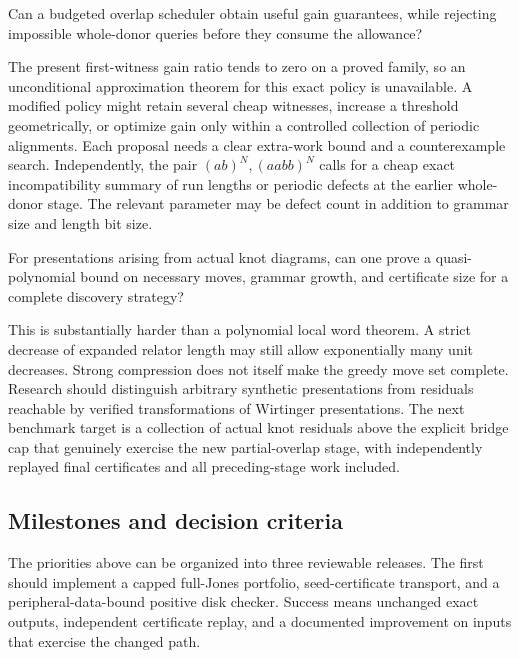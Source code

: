 \begin{question}
Can a budgeted overlap scheduler obtain useful gain guarantees, while
rejecting impossible whole-donor queries before they consume the allowance?
\end{question}

The present first-witness gain ratio tends to zero on a proved family, so
an unconditional approximation theorem for this exact policy is unavailable.
A modified policy might retain several cheap witnesses, increase a threshold
geometrically, or optimize gain only within a controlled collection of
periodic alignments. Each proposal needs a clear extra-work bound and a
counterexample search. Independently, the pair $(ab)^N,(aabb)^N$ calls for
a cheap exact incompatibility summary of run lengths or periodic defects
at the earlier whole-donor stage. The relevant parameter may be defect count
in addition to grammar size and length bit size.

\begin{question}
For presentations arising from actual knot diagrams, can one prove a
quasi-polynomial bound on necessary moves, grammar growth, and certificate
size for a complete discovery strategy?
\end{question}

This is substantially harder than a polynomial local word theorem. A strict
decrease of expanded relator length may still allow exponentially many
unit decreases. Strong compression does not itself make the greedy move
set complete. Research should distinguish arbitrary synthetic presentations
from residuals reachable by verified transformations of Wirtinger
presentations. The next benchmark target is a collection of actual knot
residuals above the explicit bridge cap that genuinely exercise the new
partial-overlap stage, with independently replayed final certificates and
all preceding-stage work included.

\subsection{Milestones and decision criteria}

The priorities above can be organized into three reviewable releases.
The first should implement a capped full-Jones portfolio, seed-certificate
transport, and a peripheral-data-bound positive disk checker. Success means
unchanged exact outputs, independent certificate replay, and a documented
improvement on inputs that exercise the changed path.

